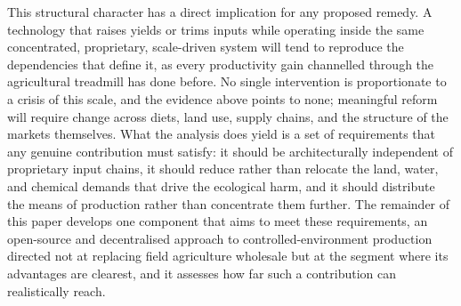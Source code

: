 This structural character has a direct implication for any proposed remedy. A technology that raises yields or trims inputs while operating inside the same concentrated, proprietary, scale-driven system will tend to reproduce the dependencies that define it, as every productivity gain channelled through the agricultural treadmill has done before. No single intervention is proportionate to a crisis of this scale, and the evidence above points to none; meaningful reform will require change across diets, land use, supply chains, and the structure of the markets themselves. What the analysis does yield is a set of requirements that any genuine contribution must satisfy: it should be architecturally independent of proprietary input chains, it should reduce rather than relocate the land, water, and chemical demands that drive the ecological harm, and it should distribute the means of production rather than concentrate them further. The remainder of this paper develops one component that aims to meet these requirements, an open-source and decentralised approach to controlled-environment production directed not at replacing field agriculture wholesale but at the segment where its advantages are clearest, and it assesses how far such a contribution can realistically reach.

